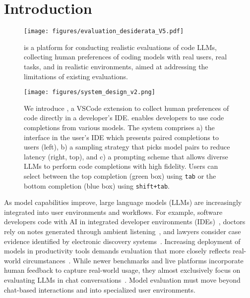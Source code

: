 \section{Introduction}


\begin{figure}[t]
\centering
\texttt{[image: figures/evaluation\_desiderata\_V5.pdf]}
\vspace{-0.5cm}
\caption{\systemName is a platform for conducting realistic evaluations of code LLMs, collecting human preferences of coding models with real users, real tasks, and in realistic environments, aimed at addressing the limitations of existing evaluations.
}
\label{fig:motivation}
\end{figure}

\begin{figure*}[t]
\centering
\texttt{[image: figures/system\_design\_v2.png]}
\caption{We introduce \systemName, a VSCode extension to collect human preferences of code directly in a developer's IDE. \systemName enables developers to use code completions from various models. The system comprises a) the interface in the user's IDE which presents paired completions to users (left), b) a sampling strategy that picks model pairs to reduce latency (right, top), and c) a prompting scheme that allows diverse LLMs to perform code completions with high fidelity.
Users can select between the top completion (green box) using \texttt{tab} or the bottom completion (blue box) using \texttt{shift+tab}.}
\label{fig:overview}
\end{figure*}

As model capabilities improve, large language models (LLMs) are increasingly integrated into user environments and workflows.
For example, software developers code with AI in integrated developer environments (IDEs)~\citep{peng2023impact}, doctors rely on notes generated through ambient listening~\citep{oberst2024science}, and lawyers consider case evidence identified by electronic discovery systems~\citep{yang2024beyond}.
Increasing deployment of models in productivity tools demands evaluation that more closely reflects real-world circumstances~\citep{hutchinson2022evaluation, saxon2024benchmarks, kapoor2024ai}.
While newer benchmarks and live platforms incorporate human feedback to capture real-world usage, they almost exclusively focus on evaluating LLMs in chat conversations~\citep{zheng2023judging,dubois2023alpacafarm,chiang2024chatbot, kirk2024the}.
Model evaluation must move beyond chat-based interactions and into specialized user environments.



